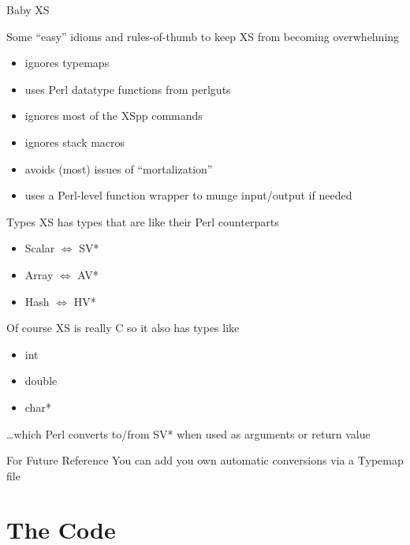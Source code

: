 \documentclass{beamer}
\begin{document}
\begin{frame}{Baby XS}
  \begin{block}{}
    Some ``easy'' idioms and rules-of-thumb to keep XS from becoming overwhelming
  \end{block}
  \begin{itemize}
    \item ignores typemaps
    \item uses Perl datatype functions from perlguts
    \item ignores most of the XSpp commands
    \item ignores stack macros
    \item avoids (most) issues of ``mortalization''
    \item uses a Perl-level function wrapper to munge input/output if needed
  \end{itemize}
\end{frame}

\begin{frame}{Types}
  XS has types that are like their Perl counterparts
  \begin{itemize}
    \item Scalar $\Leftrightarrow$ SV*
    \item Array $\Leftrightarrow$ AV*
    \item Hash $\Leftrightarrow$ HV*
  \end{itemize}
  Of course XS is really C so it also has types like
  \begin{itemize}
    \item int
    \item double
    \item char*
  \end{itemize}
  \ldots which Perl converts to/from SV* when used as arguments or return value
  \begin{block}{For Future Reference}
    You can add you own automatic conversions via a \alert{Typemap} file
  \end{block}
\end{frame}

\section{The Code}
\end{document}
